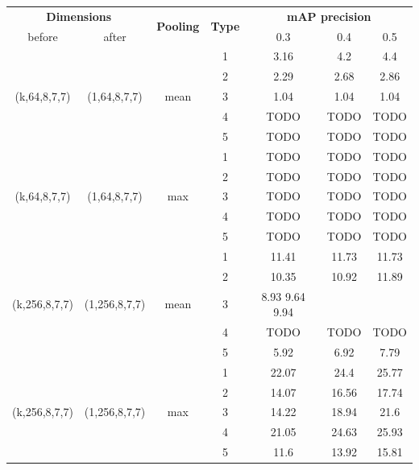 \documentclass{report}
\begin{document}
\begin{center}
\begin{longtable}{||c | c | c| c||c c c||}

  \hline
  \multicolumn{2}{||c|}{\textbf{Dimensions}} & \multirow{2}{*}{ \textbf{Pooling}} &\multirow{2}{*}{\textbf{Type}} & \multicolumn{3}{|c||}{\textbf{mAP precision}}\\

   before & after &  {} & {} &  0.3 &  0.4 & 0.5 \\
 \hline   \hline
 \multirow{5}{*}{(k,64,8,7,7)} & \multirow{5}{*}{(1,64,8,7,7)} & \multirow{5}{*}{mean}  & 1 &  3.16 & 4.2 & 4.4    \\
  \cline{4-7}
  {} & {} & {} & 2 & 2.29 & 2.68 & 2.86    \\
    \cline{4-7}
  {} & {} & {} & 3 & 1.04 & 1.04 & 1.04    \\
    \cline{4-7}
  {} & {} & {} & 4 & TODO & TODO & TODO    \\
    \cline{4-7}
  {} & {} & {} & 5 & TODO & TODO & TODO    \\
  \hline
 \multirow{5}{*}{(k,64,8,7,7)} & \multirow{5}{*}{(1,64,8,7,7)} & \multirow{5}{*}{max}  & 1 & TODO & TODO & TODO \\
    \cline{4-7}
  {} & {} & {} & 2 & TODO & TODO & TODO    \\
    \cline{4-7}
  {} & {} & {} & 3 & TODO & TODO & TODO    \\
    \cline{4-7}
  {} & {} & {} & 4 & TODO & TODO & TODO    \\
    \cline{4-7}
  {} & {} & {} & 5 & TODO & TODO & TODO     \\

  \hline   \hline

 \multirow{5}{*}{(k,256,8,7,7)} & \multirow{5}{*}{(1,256,8,7,7)} & \multirow{5}{*}{mean}  & 1 &  11.41 & 11.73 & 11.73 \\

    \cline{4-7}
  {} & {} & {} & 2 & 10.35 & 10.92 &11.89 \\
    \cline{4-7}
  {} & {} & {} & 3 & 8.93 9.64 9.94 \\
    \cline{4-7}
  {} & {} & {} & 4 & TODO & TODO & TODO \\
    \cline{4-7}
  {} & {} & {} & 5 & 5.92 & 6.92 & 7.79 \\
    \hline
 \multirow{5}{*}{(k,256,8,7,7)} & \multirow{5}{*}{(1,256,8,7,7)} & \multirow{5}{*}{max}  & 1  & 22.07 & 24.4 & 25.77  \\
    \cline{4-7}
  {} & {} & {} & 2  & 14.07 & 16.56 & 17.74 \\
    \cline{4-7}
  {} & {} & {} & 3  & 14.22 & 18.94 &21.6 \\
    \cline{4-7}
  {} & {} & {} & 4  & 21.05 & 24.63 & 25.93 \\
    \cline{4-7}
  {} & {} & {} & 5  & 11.6 & 13.92 & 15.81 \\
  \hline   
  

\end{longtable}
\end{center}
\end{document}
